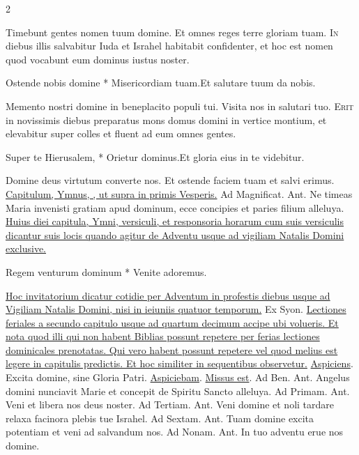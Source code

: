 \begin{multicols*}{2}
\begin{responsory-breve}
\end{responsory-breve}%
\V Timebunt gentes nomen tuum domine. \R Et omnes reges terre gloriam tuam.
\lettrine[lines=2]{\zallmancaps \color{Red} I}{n} diebus illis salvabitur Iuda et Israhel habitabit confidenter, et hoc est nomen quod vocabunt eum dominus iustus noster.
\begin{responsory-breve}
{Ostende nobis domine * Misericordiam tuam.}{Et salutare tuum da nobis.}
\end{responsory-breve}%
\V Memento nostri domine in beneplacito populi tui. \R Visita nos in salutari tuo.
\lettrine[lines=2]{\zallmancaps \color{Blue} E}{rit} in novissimis diebus preparatus mons domus domini in vertice montium, et elevabitur super colles et fluent ad eum omnes gentes.
\begin{responsory-breve}
{Super te Hierusalem, * Orietur dominus.}{Et gloria eius in te videbitur.}
\end{responsory-breve}%
\V Domine deus virtutum converte nos. \R Et ostende faciem tuam et salvi erimus.
 \ul{Capitulum, Ymnus, \Vbar, ut supra in primis Vesperis.} {\color{Red} Ad Magnificat. Ant.} Ne timeas Maria invenisti gratiam apud dominum, ecce concipies et paries filium alleluya. 
\newline \ul{Huius diei capitula, Ymni, versiculi, et responsoria horarum cum suis versiculis dicantur suis locis quando agitur de Adventu usque ad vigiliam Natalis Domini exclusive.}
\begin{invitatory}
{Regem venturum dominum * Venite adoremus.}
\end{invitatory}
\newline \ul{Hoc invitatorium dicatur cotidie per Adventum in profestis diebus usque ad Vigiliam Natalis Domini, nisi in ieiuniis quatuor temporum.} \V Ex Syon.
\newline \ul{Lectiones feriales a secundo capitulo usque ad quartum decimum accipe ubi volueris. Et nota quod illi qui non habent Biblias possunt repetere per ferias lectiones dominicales prenotatas. Qui vero habent possunt repetere vel quod melius est legere in capitulis predictis. Et hoc similiter in sequentibus observetur.}
\R \hyperlink{aspiciens}{Aspiciens}. \V Excita domine, sine Gloria Patri. \R \hyperlink{aspiciebam}{Aspiciebam}. \R \hyperlink{missus-est}{Missus est}. {\color{Red} Ad Ben. Ant.} Angelus domini nunciavit Marie et concepit de Spiritu Sancto alleluya. {\color{Red} Ad Primam. Ant.} Veni et libera nos deus noster. {\color{Red} Ad Tertiam. Ant.} Veni domine et noli tardare relaxa facinora plebis tue Israhel. {\color{Red} Ad Sextam. Ant.} Tuam domine excita potentiam et veni ad salvandum nos. {\color{Red} Ad Nonam. Ant.} In tuo adventu erue nos domine.

\end{multicols*}

